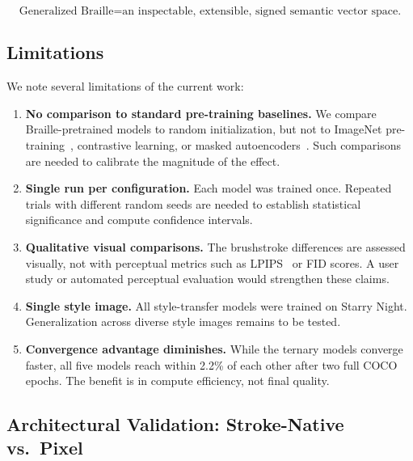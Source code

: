 \documentclass[11pt,a4paper]{article}
\begin{document}
\begin{equation}
  \boxed{
    \text{Generalized Braille}
    = \text{an inspectable, extensible, signed semantic vector space.}
  }
\end{equation}

\subsection{Limitations}

We note several limitations of the current work:

\begin{enumerate}
  \item \textbf{No comparison to standard pre-training baselines.}
    We compare Braille-pretrained models to random initialization,
    but not to ImageNet pre-training~\cite{simonyan2015vgg},
    contrastive learning, or masked autoencoders~\cite{he2022mae}.
    Such comparisons are needed to calibrate the magnitude of the effect.

  \item \textbf{Single run per configuration.}
    Each model was trained once. Repeated trials with different
    random seeds are needed to establish statistical significance
    and compute confidence intervals.

  \item \textbf{Qualitative visual comparisons.}
    The brushstroke differences are assessed visually, not with
    perceptual metrics such as LPIPS~\cite{zhang2018lpips} or
    FID scores. A user study or automated perceptual evaluation
    would strengthen these claims.

  \item \textbf{Single style image.}
    All style-transfer models were trained on Starry Night.
    Generalization across diverse style images remains to be tested.

  \item \textbf{Convergence advantage diminishes.}
    While the ternary models converge faster, all five models
    reach within 2.2\% of each other after two full COCO epochs.
    The benefit is in compute efficiency, not final quality.
\end{enumerate}

\subsection{Architectural Validation: Stroke-Native vs.\ Pixel}
\label{sec:braillenet}
\end{document}
